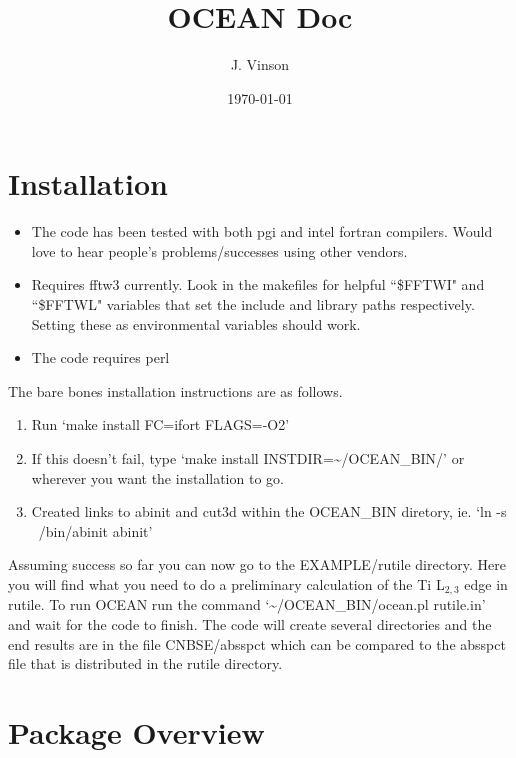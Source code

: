 \documentclass[12pt]{article}
\begin{document}
\title{OCEAN Doc}

\author{J. Vinson}
\date{\today}

\maketitle

\section{Installation}
\begin{itemize}
\item The code has been tested with both pgi and intel fortran compilers. Would love to hear people's problems/successes using other vendors. 
\item Requires fftw3 currently. Look in the makefiles for helpful ``\$FFTWI" and ``\$FFTWL" variables that set the include and library paths respectively. Setting these as environmental variables should work.
\item The code requires perl
\end{itemize}

The bare bones installation instructions are as follows.

\begin{enumerate}
\item{ Run `make install FC=ifort FLAGS=-O2'}
\item{ If this doesn't fail, type `make install INSTDIR=\textasciitilde/OCEAN\_BIN/' or wherever you want the installation to go.}
\item{ Created links to abinit and cut3d within the OCEAN\_BIN diretory, ie. `ln -s ~/bin/abinit abinit'}
\end{enumerate}

Assuming success so far you can now go to the EXAMPLE/rutile directory. Here you will find what you need to do a preliminary 
calculation of the Ti L$_{2,3}$ edge in rutile. To run OCEAN run the command `\textasciitilde/OCEAN\_BIN/ocean.pl rutile.in' 
and wait for the code to finish. The code will create several directories and the end results are in the file CNBSE/absspct which can 
be compared to the absspct file that is distributed in the rutile directory.

\section{Package Overview}
\end{document}
